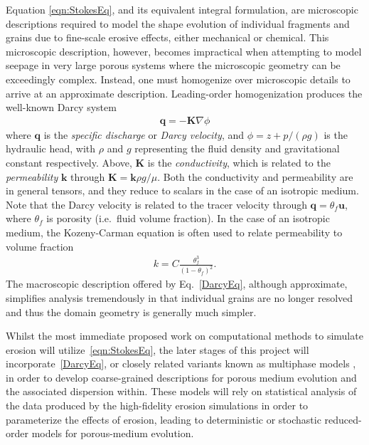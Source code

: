\documentclass[11pt]{article}
\newcommand{\bvec}[1]{{\mathbf{#1}}}
\newcommand{\grad}{\nabla}
\newcommand{\uu}{\bvec{u}}
\newcommand {\qq} {\bvec{q}}
\begin{document}
Equation \eqref{eqn:StokesEq}, and its equivalent integral formulation, are microscopic descriptions required to model the shape evolution of individual fragments and grains due to fine-scale erosive effects, either mechanical or chemical. This microscopic description, however, becomes impractical when attempting to model seepage in very large porous systems where the microscopic geometry can be exceedingly complex. Instead, one must homogenize over microscopic details to arrive at an approximate description. Leading-order homogenization produces the well-known Darcy system 
\begin{align}
  \label{DarcyEq}
  \qq = - \bvec{K} \grad \phi
\end{align}
where $\qq$ is the {\em specific discharge} or {\em Darcy velocity}, and $\phi = z + p/(\rho g)$ is the hydraulic head, with $\rho$ and $g$ representing the fluid density and gravitational constant respectively.  Above, $\bvec{K}$ is the {\em conductivity}, which is related to the {\em permeability} $\bvec{k}$ through $\bvec{K} = \bvec{k} \rho g/\mu$.  Both the conductivity and permeability are in general tensors, and they reduce to scalars in the case of an isotropic medium. Note that the Darcy velocity is related to the tracer velocity through $\qq = \theta_f \uu$, where $\theta_f$ is porosity (i.e.~fluid volume fraction).  In the case of an isotropic medium, the Kozeny-Carman equation is often used to relate permeability to volume fraction~\cite{bear2013dynamics}
\begin{align}
  k = C \frac{\theta_f^3}{(1-\theta_f)^2}.
\end{align}
The macroscopic description offered by Eq.~\eqref{DarcyEq}, although approximate, simplifies analysis tremendously in that individual grains are no longer resolved and thus the domain geometry is generally much simpler.

Whilst the most immediate proposed work on computational methods to simulate erosion will utilize~\eqref{eqn:StokesEq}, the later stages of this project will incorporate~\eqref{DarcyEq}, or closely related variants known as multiphase models \cite{breward2003multiphase, cogan2010multiphase, Imma2019, eastham2019multiphase}, in order to develop coarse-grained descriptions for porous medium evolution and the associated dispersion within. These models will rely on statistical analysis of the data produced by the high-fidelity erosion simulations in order to parameterize the effects of erosion, leading to deterministic or stochastic reduced-order models for porous-medium evolution. 
\end{document}
